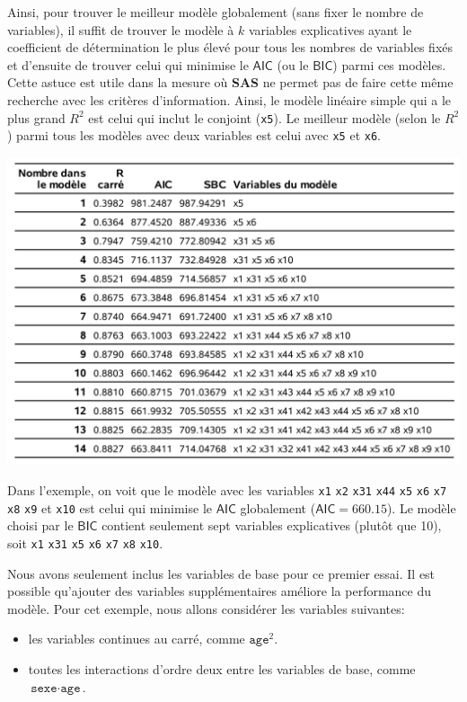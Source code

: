 \documentclass[
  11pt,
  letterpaper,
]{book}
\providecommand{\tightlist}{%
  \setlength{\itemsep}{0pt}\setlength{\parskip}{0pt}}
\theoremstyle{definition}
\theoremstyle{definition}
\theoremstyle{definition}
\theoremstyle{remark}
\begin{document}
Ainsi, pour trouver le meilleur modèle globalement (sans fixer le nombre de variables), il suffit de trouver le modèle à \(k\) variables explicatives ayant le coefficient de détermination le plus élevé pour tous les nombres de variables fixés et d'ensuite de trouver celui qui minimise le \(\mathsf{AIC}\) (ou le \(\mathsf{BIC}\)) parmi ces modèles. Cette astuce est utile dans la mesure où \textbf{SAS} ne permet pas de faire cette même recherche avec les critères d'information. Ainsi, le modèle linéaire simple qui a le plus grand \(R^2\) est celui qui inclut le conjoint (\texttt{x5}). Le meilleur modèle (selon le \(R^2\)) parmi tous les modèles avec deux variables est celui avec \texttt{x5} et \texttt{x6}.

\begin{center}\includegraphics[width=0.9\linewidth]{figures/02-select-e7} \end{center}

Dans l'exemple, on voit que le modèle avec les variables \texttt{x1} \texttt{x2} \texttt{x31} \texttt{x44} \texttt{x5} \texttt{x6} \texttt{x7} \texttt{x8} \texttt{x9} et \texttt{x10} est celui qui minimise le \(\mathsf{AIC}\) globalement (\(\mathsf{AIC}=660.15\)). Le modèle choisi par le \(\mathsf{BIC}\) contient seulement sept variables explicatives (plutôt que 10), soit \texttt{x1} \texttt{x31} \texttt{x5} \texttt{x6} \texttt{x7} \texttt{x8} \texttt{x10}.

Nous avons seulement inclus les variables de base pour ce premier essai. Il est possible qu'ajouter des variables supplémentaires améliore la performance du modèle. Pour cet exemple, nous allons considérer les variables suivantes:

\begin{itemize}
\tightlist
\item
  les variables continues au carré, comme \(\texttt{age}^2\).
\item
  toutes les interactions d'ordre deux entre les variables de base, comme \(\texttt{sexe}\cdot\texttt{age}\).
\end{itemize}
\end{document}
